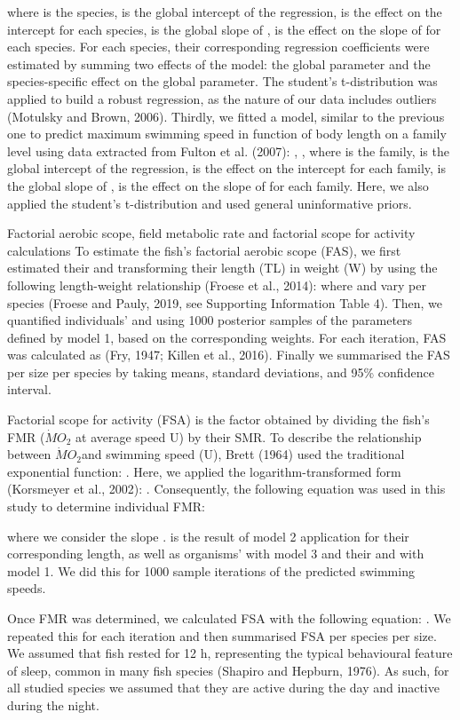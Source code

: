 \documentclass[12pt,a4paper]{article}
\begin{document}
\noindent where is the species, is the global intercept of the
regression, is the effect on the intercept for each species, is the
global slope of , is the effect on the slope of for each species. For
each species, their corresponding regression coefficients were estimated
by summing two effects of the model: the global parameter and the
species-specific effect on the global parameter. The student's
t-distribution was applied to build a robust regression, as the nature
of our data includes outliers (Motulsky and Brown, 2006). Thirdly, we
fitted a model, similar to the previous one to predict maximum swimming
speed in function of body length on a family level using data extracted
from Fulton et al. (2007): , , \noindent where is the family, is the
global intercept of the regression, is the effect on the intercept for
each family, is the global slope of , is the effect on the slope of for
each family. Here, we also applied the student's t-distribution and used
general uninformative priors.

\noindent Factorial aerobic scope, field metabolic rate and factorial
scope for activity calculations To estimate the fish's factorial aerobic
scope (FAS), we first estimated their and transforming their length (TL)
in weight (W) by using the following length-weight relationship (Froese
et al., 2014): where and vary per species (Froese and Pauly, 2019, see
Supporting Information Table 4). Then, we quantified individuals' and
using 1000 posterior samples of the parameters defined by model 1, based
on the corresponding weights. For each iteration, FAS was calculated as
(Fry, 1947; Killen et al., 2016). Finally we summarised the FAS per size
per species by taking means, standard deviations, and 95\% confidence
interval.

\noindent Factorial scope for activity (FSA) is the factor obtained by
dividing the fish's FMR (\(\dot{M}O_{2}\) at average speed U) by their
SMR. To describe the relationship between \(\dot{M}O_{2}\)and swimming
speed (U), Brett (1964) used the traditional exponential function: .
Here, we applied the logarithm-transformed form (Korsmeyer et al.,
2002): . Consequently, the following equation was used in this study to
determine individual FMR:

\noindent where we consider the slope . is the result of model 2
application for their corresponding length, as well as organisms' with
model 3 and their and with model 1. We did this for 1000 sample
iterations of the predicted swimming speeds.

\noindent Once FMR was determined, we calculated FSA with the following
equation: . We repeated this for each iteration and then summarised FSA
per species per size. We assumed that fish rested for 12 h, representing
the typical behavioural feature of sleep, common in many fish species
(Shapiro and Hepburn, 1976). As such, for all studied species we assumed
that they are active during the day and inactive during the night.
\end{document}
